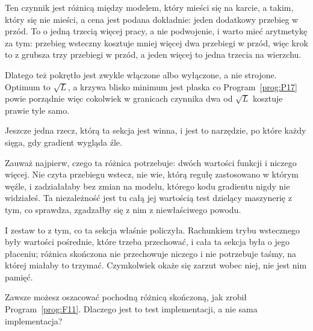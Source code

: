 \begin{fr}
\begin{aibox}
Ten czynnik jest różnicą między modelem, który mieści się na karcie, a takim,
który się nie mieści, a cena jest podana dokładnie: jeden dodatkowy przebieg
w przód. To o jedną trzecią więcej pracy, a nie podwojenie, i warto mieć
arytmetykę za tym: przebieg wsteczny kosztuje mniej więcej dwa przebiegi w
przód, więc krok to z grubsza trzy przebiegi w przód, a jeden więcej to jedna
trzecia na wierzchu.

Dlatego też pokrętło jest zwykle włączone albo wyłączone, a nie strojone.
Optimum to $\sqrt{L}$, a krzywa blisko minimum jest płaska \dash{} co
Program~\ref{prog:P17} powie porządnie \dash{} więc cokolwiek w granicach
czynnika dwa od $\sqrt{L}$ kosztuje prawie tyle samo.
\end{aibox}
\end{fr}

\begin{fr}
Jeszcze jedna rzecz, którą ta sekcja jest winna, i jest to narzędzie, po które
każdy sięga, gdy gradient wygląda źle.

Zauważ najpierw, czego ta różnica potrzebuje: dwóch wartości funkcji i
niczego więcej. Nie czyta przebiegu wstecz, nie wie, którą regułę zastosowano
w którym węźle, i zadziałałaby bez zmian na modelu, którego kodu gradientu
nigdy nie widziałeś. Ta niezależność jest tu całą jej wartością \dash{} test
dzielący maszynerię z tym, co sprawdza, zgadzałby się z nim z niewłaściwego
powodu.

I zestaw to z tym, co ta sekcja właśnie policzyła. Rachunkiem trybu wstecznego
były wartości pośrednie, które trzeba przechować, i cała ta sekcja była o jego
płaceniu; różnica skończona nie przechowuje niczego i nie potrzebuje taśmy, na
której miałaby to trzymać. Czymkolwiek okaże się zarzut wobec niej, nie jest
nim pamięć.

Zawsze możesz oszacować pochodną różnicą skończoną, jak zrobił
Program~\ref{prog:F11}. Dlaczego jest to test implementacji, a nie sama
implementacja?
\dotline
\nextframe
\end{fr}

